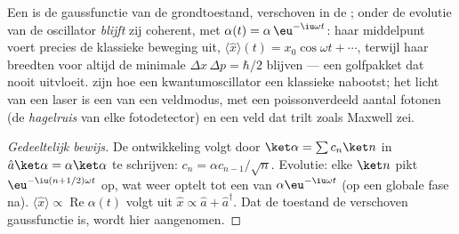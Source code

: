 \begin{proposition}\label{prop:b3:harmonic-oscillator:coherent-motion}
Een  is de gaussfunctie van de grondtoestand, verschoven
in de ; onder de evolutie van de oscillator \emph{blijft} zij
coherent, met $\alpha(t) = \alpha\,\eu^{-\iu\omega t}$: haar middelpunt
voert precies de klassieke beweging uit, $\langle\hat x\rangle(t) =
x_0\cos\omega t + \cdots$, terwijl haar breedten voor altijd de minimale
$\Delta x\,\Delta p = \hbar/2$ blijven --- een golfpakket dat nooit
uitvloeit.  zijn hoe een kwantumoscillator een
klassieke nabootst; het licht van een laser is een  van
een veldmodus, met een poissonverdeeld aantal fotonen (de \emph{hagelruis}
van elke fotodetector) en een veld dat trilt zoals Maxwell zei.
\end{proposition}

\begin{proof}[Gedeeltelijk bewijs]
De ontwikkeling volgt door $\ket\alpha = \sum c_n\ket n$ in $\hat a\ket\alpha = \alpha\ket\alpha$ te schrijven: $c_n = \alpha c_{n-1}/\sqrt
n$. Evolutie: elke $\ket n$ pikt $\eu^{-\iu(n + 1/2)\omega t}$ op, wat
weer optelt tot een  van $\alpha\eu^{-\iu\omega t}$ (op
een globale fase na). $\langle\hat x\rangle \propto
\operatorname{Re}\alpha(t)$ volgt uit $\hat x \propto \hat a +
\hat a^\dagger$. Dat de toestand de verschoven gaussfunctie is, wordt hier
aangenomen.
\end{proof}

